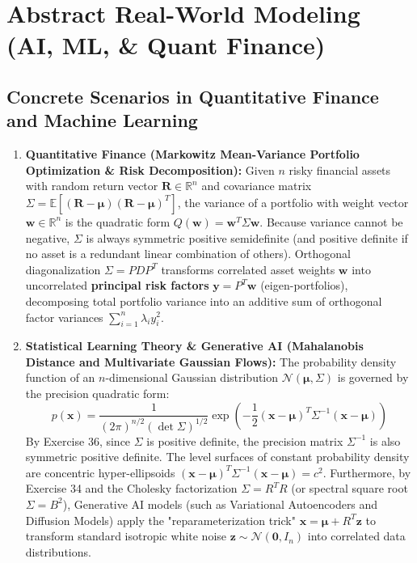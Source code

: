\documentclass[11pt, letterpaper]{article}
\theoremstyle{definition}
\theoremstyle{remark}
\begin{document}
\section{Abstract Real-World Modeling (AI, ML, \& Quant Finance)}

\subsection{Concrete Scenarios in Quantitative Finance and Machine Learning}
\begin{enumerate}
    \item \textbf{Quantitative Finance (Markowitz Mean-Variance Portfolio Optimization \& Risk Decomposition):}
    Given $n$ risky financial assets with random return vector $\mathbf{R} \in \mathbb{R}^n$ and covariance matrix $\Sigma = \mathbb{E}[(\mathbf{R} - \boldsymbol{\mu})(\mathbf{R} - \boldsymbol{\mu})^T]$, the variance of a portfolio with weight vector $\mathbf{w} \in \mathbb{R}^n$ is the quadratic form $Q(\mathbf{w}) = \mathbf{w}^T \Sigma \mathbf{w}$. Because variance cannot be negative, $\Sigma$ is always symmetric positive semidefinite (and positive definite if no asset is a redundant linear combination of others). Orthogonal diagonalization $\Sigma = P D P^T$ transforms correlated asset weights $\mathbf{w}$ into uncorrelated \textbf{principal risk factors} $\mathbf{y} = P^T \mathbf{w}$ (eigen-portfolios), decomposing total portfolio variance into an additive sum of orthogonal factor variances $\sum_{i=1}^n \lambda_i y_i^2$.
    
    \item \textbf{Statistical Learning Theory \& Generative AI (Mahalanobis Distance and Multivariate Gaussian Flows):}
    The probability density function of an $n$-dimensional Gaussian distribution $\mathcal{N}(\boldsymbol{\mu}, \Sigma)$ is governed by the precision quadratic form:
    \[
    p(\mathbf{x}) = \frac{1}{(2\pi)^{n/2} (\det \Sigma)^{1/2}} \exp\left( -\frac{1}{2} (\mathbf{x} - \boldsymbol{\mu})^T \Sigma^{-1} (\mathbf{x} - \boldsymbol{\mu}) \right)
    \]
    By Exercise 36, since $\Sigma$ is positive definite, the precision matrix $\Sigma^{-1}$ is also symmetric positive definite. The level surfaces of constant probability density are concentric hyper-ellipsoids $(\mathbf{x} - \boldsymbol{\mu})^T \Sigma^{-1} (\mathbf{x} - \boldsymbol{\mu}) = c^2$. Furthermore, by Exercise 34 and the Cholesky factorization $\Sigma = R^T R$ (or spectral square root $\Sigma = B^2$), Generative AI models (such as Variational Autoencoders and Diffusion Models) apply the "reparameterization trick" $\mathbf{x} = \boldsymbol{\mu} + R^T \mathbf{z}$ to transform standard isotropic white noise $\mathbf{z} \sim \mathcal{N}(\mathbf{0}, I_n)$ into correlated data distributions.
    

\end{enumerate}
\end{document}
